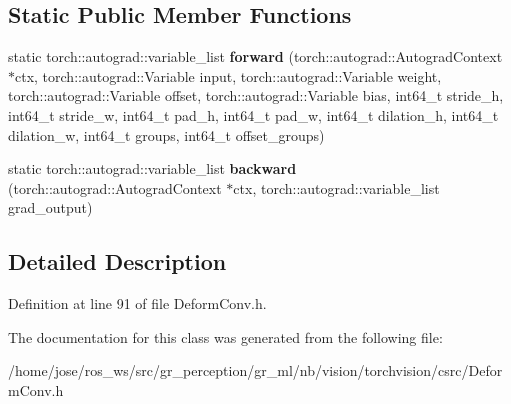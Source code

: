 \subsection*{Static Public Member Functions}
\begin{DoxyCompactItemize}
\item 
\mbox{\label{classDeformConv2dFunction_a75af00110c99ad855df298d50acd2d70}} 
static torch\+::autograd\+::variable\+\_\+list {\bfseries forward} (torch\+::autograd\+::\+Autograd\+Context $\ast$ctx, torch\+::autograd\+::\+Variable input, torch\+::autograd\+::\+Variable weight, torch\+::autograd\+::\+Variable offset, torch\+::autograd\+::\+Variable bias, int64\+\_\+t stride\+\_\+h, int64\+\_\+t stride\+\_\+w, int64\+\_\+t pad\+\_\+h, int64\+\_\+t pad\+\_\+w, int64\+\_\+t dilation\+\_\+h, int64\+\_\+t dilation\+\_\+w, int64\+\_\+t groups, int64\+\_\+t offset\+\_\+groups)
\item 
\mbox{\label{classDeformConv2dFunction_ad599ff3611ccbba6f092fc0ad64a2d47}} 
static torch\+::autograd\+::variable\+\_\+list {\bfseries backward} (torch\+::autograd\+::\+Autograd\+Context $\ast$ctx, torch\+::autograd\+::variable\+\_\+list grad\+\_\+output)
\end{DoxyCompactItemize}


\subsection{Detailed Description}


Definition at line 91 of file Deform\+Conv.\+h.



The documentation for this class was generated from the following file\+:\begin{DoxyCompactItemize}
\item 
/home/jose/ros\+\_\+ws/src/gr\+\_\+perception/gr\+\_\+ml/nb/vision/torchvision/csrc/Deform\+Conv.\+h\end{DoxyCompactItemize}
